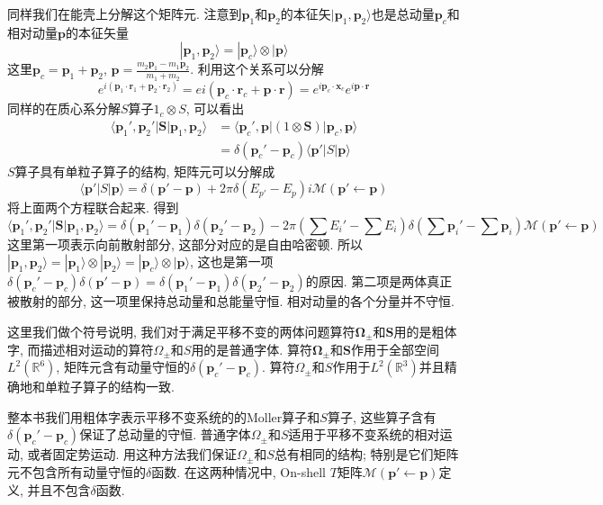 \documentclass[a4paper,11pt]{book}
\newcommand{\pp}{\mathbf{p}}
\begin{document}
同样我们在能壳上分解这个矩阵元. 注意到$\pp_1$和$\pp_2$的本征矢$|\pp_1,\pp_2\rangle$也是总动量$\pp_c$和相对动量$\pp$的本征矢量
\begin{equation*}
  |\pp_1,\pp_2\rangle=|\pp_c\rangle\otimes|\pp\rangle
\end{equation*}
这里$\pp_c=\pp_1+\pp_2$, $\pp=\frac{m_2\pp_1-m_1\pp_2}{m_1+m_2}$. 利用这个关系可以分解
\begin{equation*}
  e^{i(\pp_1\cdot\mathbf{r}_1+\pp_2\cdot\mathbf{r}_2)}=e{i(\pp_c\cdot\mathbf{r}_c+\pp\cdot\mathbf{r})}=e^{i\pp_c\cdot\mathbf{x}_c}e^{i\pp\cdot\mathbf{r}}
\end{equation*}
同样的在质心系分解$S$算子$1_c\otimes S$, 可以看出
\begin{equation*}
  \begin{split}
     \langle\pp_1',\pp_2'|\mathbf{S}|\pp_1,\pp_2\rangle&=\langle\pp_c',\pp|(1\otimes\mathbf{S})|\pp_c,\pp\rangle\\
       &=\delta(\pp_c'-\pp_c)\langle\pp'|S|\pp\rangle
  \end{split}
\end{equation*}
$S$算子具有单粒子算子的结构, 矩阵元可以分解成
\begin{equation*}
  \langle\pp'|S|\pp\rangle=\delta(\pp'-\pp)+2\pi\delta(E_{p'}-E_p)i\mathcal{M}(\pp'\leftarrow\pp)
\end{equation*}
将上面两个方程联合起来. 得到
\begin{equation}\label{scatter two T}
  \langle\pp_1',\pp_2'|\mathbf{S}|\pp_1,\pp_2\rangle=\delta(\pp_1'-\pp_1)\delta(\pp_2'-\pp_2)-2\pi(\sum E_i'-\sum E_i)\delta(\sum\pp_i'-\sum\pp_i)\mathcal{M}(\pp'\leftarrow\pp)
\end{equation}
这里第一项表示向前散射部分, 这部分对应的是自由哈密顿. 所以$|\pp_1,\pp_2\rangle=|\pp_1\rangle\otimes|\pp_2\rangle=|\pp_c\rangle\otimes|\pp\rangle$, 这也是第一项$\delta(\pp_c'-\pp_c)\delta(\pp'-\pp)=\delta(\pp_1'-\pp_1)\delta(\pp_2'-\pp_2)$的原因. 第二项是两体真正被散射的部分, 这一项里保持总动量和总能量守恒. 相对动量的各个分量并不守恒.

这里我们做个符号说明, 我们对于满足平移不变的两体问题算符$\mathbf{\Omega}_{\pm}$和$\mathbf{S}$用的是粗体字, 而描述相对运动的算符$\Omega_\pm$和$S$用的是普通字体. 算符$\mathbf{\Omega}_\pm$和$\mathbf{S}$作用于全部空间$L^2(\mathbb{R}^6)$, 矩阵元含有动量守恒的$\delta(\pp_c'-\pp_c)$. 算符$\Omega_\pm$和$S$作用于$L^2(\mathbb{R}^3)$并且精确地和单粒子算子的结构一致.

整本书我们用粗体字表示平移不变系统的的Moller算子和$S$算子, 这些算子含有$\delta(\pp_c'-\pp_c)$保证了总动量的守恒. 普通字体$\Omega_\pm$和$S$适用于平移不变系统的相对运动, 或者固定势运动. 用这种方法我们保证$\Omega_\pm$和$S$总有相同的结构; 特别是它们矩阵元不包含所有动量守恒的$\delta$函数. 在这两种情况中, On-shell $T$矩阵$\mathcal{M}(\mathbf{p}'\leftarrow\mathbf{p})$定义, 并且不包含$\delta$函数.
\end{document}
